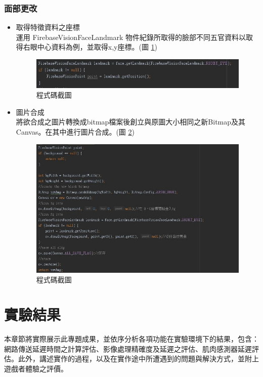 \documentclass[12pt]{article}  %
\theoremstyle{plain}
\begin{document}
\subsubsection{面部更改}
\begin{itemize}
\item 取得特徵資料之座標 \\
運用 FirebaseVisionFaceLandmark 物件紀錄所取得的臉部不同五官資料以取得右眼中心資料為例，並取得x,y座標。(圖 \ref{Landmark})
\begin{figure}[htbp]
\centering
\includegraphics[width=15cm]{pic/ch3/Landmark.jpg}
\caption{程式碼截圖} \label{Landmark}
\end{figure}

\item 圖片合成 \\
將欲合成之圖片轉換成bitmap檔案後創立與原圖大小相同之新Bitmap及其Canvas。在其中進行圖片合成。(圖 \ref{imgcon})
\begin{figure}[htbp]
\centering
\includegraphics[width=13cm]{pic/ch3/imgcon.jpg}
\caption{程式碼截圖} \label{imgcon}
\end{figure}
\end{itemize}
\newpage


\section{實驗結果}
本章節將實際展示此專題成果，並依序分析各項功能在實驗環境下的結果，包含：網路傳送延遲時間之計算評估、影像處理精確度及延遲之評估、肌肉感測器延遲評估。此外，講述實作的過程，以及在實作途中所遭遇到的問題與解決方式，並附上遊戲者體驗之評價。
\end{document}
